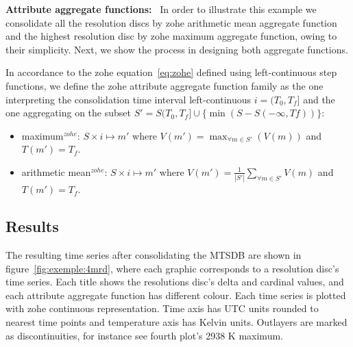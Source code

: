 \vspace{5pt} \noindent
{\bf Attribute aggregate functions:} \
In order to illustrate this example we consolidate all the resolution
discs by zohe arithmetic mean aggregate function and the highest
resolution disc by zohe maximum aggregate function, owing to their
simplicity. Next, we show the process in designing both aggregate
functions.


In accordance to the zohe equation~\ref{eq:zohe} defined using
left-continuous step functions, we define the zohe attribute aggregate
function family as the one interpreting the consolidation time
interval left-continuous $i=(T_0,T_f]$
%
and the one aggregating on the subset $S'=S(T_0,T_f] \cup \{\min(S-S(-\infty,Tf))\}$: 
%
\begin{itemize}
\renewcommand{\labelitemi}{--}
\item maximum$^{zohe}$: $S \times i \mapsto m'$ where $V(m') =
  \max_{\forall m \in S'}(V(m))$ and $T(m')=T_f$.
\item arithmetic mean$^{zohe}$: $S \times i \mapsto m'$ where $V(m')
  = \frac{1}{|S'|} \sum\limits_{\forall m\in S'} V(m)$ and
  $T(m')=T_f$. 
\end{itemize}







\subsection{Results}

The resulting time series after consolidating the MTSDB are shown in
figure~\ref{fig:exemple:4mrd}, where each graphic corresponds to a
resolution disc's time series. Each title shows the
resolutions disc's delta and cardinal values, and each attribute
aggregate function has different colour.  Each time series
is plotted with zohe continuous representation. Time axis has
UTC units rounded to nearest time points
and temperature axis has Kelvin
units. Outlayers are marked as discontinuities, for instance see
fourth plot's 2938 K maximum.


